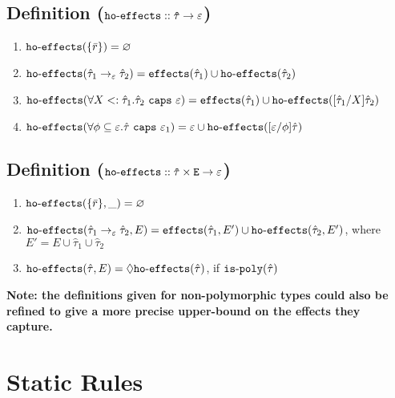 \documentclass{llncs}
\newcommand{\keywadj}[1]{\mathtt{#1}}
\newcommand{\keyw}[1]{\keywadj{#1}~}
\newcommand{\kw}[1]{\keyw{ #1 }}
\newcommand{\kwa}[1]{\keywadj{ #1 }}
\newcommand{\hyphen}{\hbox{-}}
\newcommand{\fx}[1]{ \kwa{effects}(#1) }
\newcommand{\hofx}[1]{ \kwa{ho \hyphen effects}(#1) }
\newcommand{\polycap}[3]{
	\forall #1. #2~ \kw{caps} #3
}
\begin{document}
\subsection*{Definition ($\kwa{ho \hyphen effects :: \hat \tau \rightarrow \varepsilon}$)}

\begin{enumerate}
	\item $\hofx{\{ \bar r \}} = \varnothing$
	\item $\hofx{\hat \tau_1 \rightarrow_{\varepsilon} \hat \tau_2} = \kwa{effects}(\hat \tau_1) \cup \kwa{ho \hyphen effects}(\hat \tau_2)$
	\item $\hofx{\polycap{X <: \hat \tau_1}{\hat \tau_2}{\varepsilon}} = \fx{\hat \tau_1} \cup \hofx{[\hat \tau_1/X]\hat \tau_2}$
	\item $\hofx{\polycap{\phi \subseteq \varepsilon}{\hat \tau}{\varepsilon_1}} = \varepsilon \cup \hofx{[\varepsilon/\phi]\hat \tau}$
\end{enumerate}


\subsection*{Definition ($\kwa{ho \hyphen effects :: \hat \tau \times E \rightarrow \varepsilon}$)}

\begin{enumerate}
	\item $\hofx{\{ \bar r \}, \_} = \varnothing$
	\item $\hofx{\hat \tau_1 \rightarrow_{\varepsilon} \hat \tau_2, E} = \kwa{effects}(\hat \tau_1, E') \cup \kwa{ho \hyphen effects}(\hat \tau_2, E')$, where $E' = E \cup \hat \tau_1 \cup \hat \tau_2$
	\item $\hofx{\hat \tau, E} = \lozenge\hofx{\hat \tau}$, if $\kwa{is \hyphen poly}(\hat \tau)$
\end{enumerate}


\noindent
\textbf{Note: the definitions given for non-polymorphic types could also be refined to give a more precise upper-bound on the effects they capture.}









\section{Static Rules}

\end{document}
